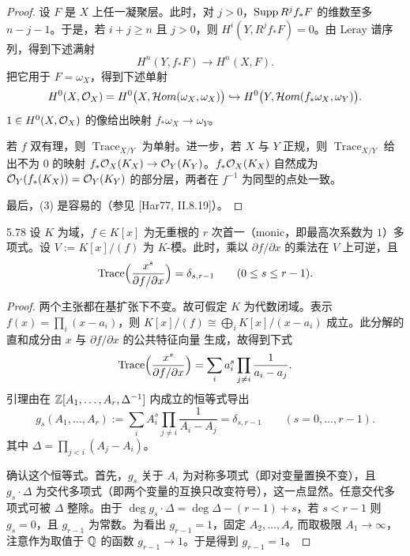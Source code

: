 \begin{proof}
设 $F$ 是 $X$ 上任一凝聚层。此时，对 $j>0$，$\operatorname{Supp} R^jf_*F$ 的维数至多 $n-j-1$。于是，若 $i+j\ge n$ 且 $j>0$，则 $H^i(Y,R^jf_*F)=0$。由 Leray 谱序列，得到下述满射
\[
H^n(Y,f_*F)\to H^n(X,F).
\]
把它用于 $F=\omega_X$，得到下述单射
\[
H^0(X,\mathcal{O}_X)=H^0\bigl(X,\mathcal{H}om(\omega_X,\omega_X)\bigr)\hookrightarrow H^0\bigl(Y,\mathcal{H}om(f_*\omega_X,\omega_Y)\bigr).
\]
$1\in H^0(X,\mathcal{O}_X)$ 的像给出映射 $f_*\omega_X\to\omega_Y$。

若 $f$ 双有理，则 $\operatorname{Trace}_{X/Y}$ 为单射。进一步，若 $X$ 与 $Y$ 正规，则 $\operatorname{Trace}_{X/Y}$ 给出不为 $0$ 的映射 $f_*\mathcal{O}_X(K_X)\to\mathcal{O}_Y(K_Y)$。$f_*\mathcal{O}_X(K_X)$ 自然成为 $\mathcal{O}_Y(f_*(K_X))=\mathcal{O}_Y(K_Y)$ 的部分层，两者在 $f^{-1}$ 为同型的点处一致。

最后，(3) 是容易的（参见 [Har77, II.8.19]）。
\end{proof}

\begin{lemmap}{5.78}
设 $K$ 为域，$f\in K[x]$ 为无重根的 $r$ 次首一（monic，即最高次系数为 $1$）多项式。设 $V:=K[x]/(f)$ 为 $K$-模。此时，乘以 $\partial f/\partial x$ 的乘法在 $V$ 上可逆，且
\[
\operatorname{Trace}\Bigl(\frac{x^s}{\partial f/\partial x}\Bigr)=\delta_{s,r-1}\qquad(0\le s\le r-1).
\]
\end{lemmap}

\begin{proof}
两个主张都在基扩张下不变。故可假定 $K$ 为代数闭域。表示 $f(x)=\prod_i(x-a_i)$，则 $K[x]/(f)\cong\bigoplus_iK[x]/(x-a_i)$ 成立。此分解的直和成分由 $x$ 与 $\partial f/\partial x$ 的公共特征向量
生成，故得到下式
\[
\operatorname{Trace}\Bigl(\frac{x^s}{\partial f/\partial x}\Bigr)=\sum_i a_i^s\prod_{j\ne i}\frac{1}{a_i-a_j}.
\]
引理由在 $\mathbb{Z}[A_1,\dots,A_r,\Delta^{-1}]$ 内成立的恒等式导出
\[
g_s(A_1,\dots,A_r):=\sum_iA_i^s\prod_{j\ne i}\frac{1}{A_i-A_j}=\delta_{s,r-1}\qquad(s=0,\dots,r-1).
\]
其中 $\Delta=\prod_{j<i}(A_j-A_i)$。

确认这个恒等式。首先，$g_s$ 关于 $A_i$ 为对称多项式（即对变量置换不变），且 $g_s\cdot\Delta$ 为交代多项式（即两个变量的互换只改变符号），这一点显然。任意交代多项式可被 $\Delta$ 整除。由于 $\deg g_s\cdot\Delta=\deg\Delta-(r-1)+s$，若 $s<r-1$ 则 $g_s=0$，且 $g_{r-1}$ 为常数。为看出 $g_{r-1}=1$，固定 $A_2,\dots,A_r$ 而取极限 $A_1\to\infty$，注意作为取值于 $\mathbb{Q}$ 的函数 $g_{r-1}\to1$。于是得到 $g_{r-1}=1$。
\end{proof}


